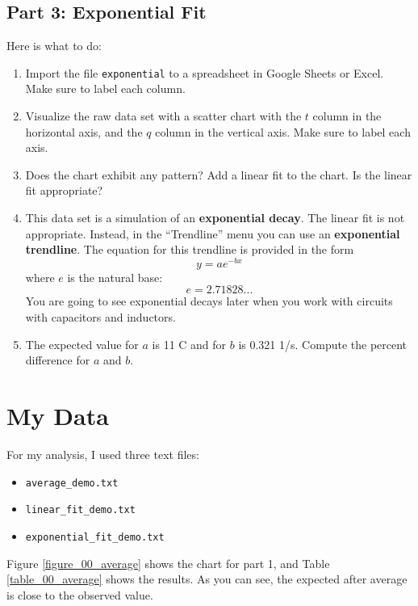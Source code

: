 \subsection{Part 3: Exponential Fit}
Here is what to do:
\begin{enumerate}
    \item Import the file \texttt{exponential} to a spreadsheet in Google Sheets or Excel. Make sure to label each column.
    \item Visualize the raw data set with a scatter chart with the $t$ column in the horizontal axis, and the $q$ column in the vertical axis. Make sure to label each axis.
    \item Does the chart exhibit any pattern? Add a linear fit to the chart. Is the linear fit appropriate?
    \item This data set is a simulation of an \textbf{exponential decay}. The linear fit is not appropriate. Instead, in the ``Trendline'' menu you can use an \textbf{exponential trendline}. The equation for this trendline is provided in the form
    \begin{equation}
        y = a e^{-bx}
    \end{equation}
    where $e$ is the natural base:
    \begin{equation*}
        e = 2.71828...
    \end{equation*}
    You are going to see exponential decays later when you work with circuits with capacitors and inductors.
    \item The expected value for $a$ is 11 C and for $b$ is 0.321 1/s. Compute the percent  difference for $a$ and $b$.
\end{enumerate}
\section{My Data}
For my analysis, I used three text files:
\begin{itemize}
    \item \texttt{average\_demo.txt}
    \item \texttt{linear\_fit\_demo.txt}
    \item \texttt{exponential\_fit\_demo.txt}
\end{itemize}
Figure \ref{figure_00_average} shows the chart for part 1, and Table \ref{table_00_average} shows the results. As you can see, the expected after average is close to the observed value.

